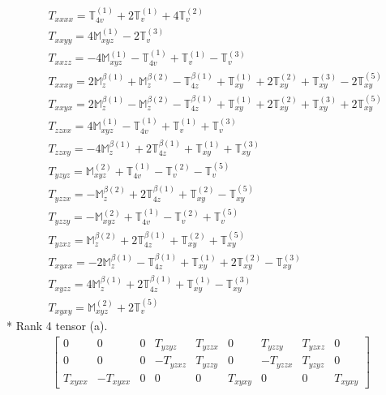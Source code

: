 \documentclass[fleqn,8pt,landscape]{jsarticle}
\begin{document}
\begin{align*}
& T_{xxxx} = \mathbb{T}_{4v}^{(1)} + 2 \mathbb{T}_{v}^{(1)} + 4 \mathbb{T}_{v}^{(2)} \\
& T_{xxyy} = 4 \mathbb{M}_{xyz}^{(1)} - 2 \mathbb{T}_{v}^{(3)} \\
& T_{xxzz} = - 4 \mathbb{M}_{xyz}^{(1)} - \mathbb{T}_{4v}^{(1)} + \mathbb{T}_{v}^{(1)} - \mathbb{T}_{v}^{(3)} \\
& T_{xxxy} = 2 \mathbb{M}_{z}^{\beta(1)} + \mathbb{M}_{z}^{\beta(2)} - \mathbb{T}_{4z}^{\beta(1)} + \mathbb{T}_{xy}^{(1)} + 2 \mathbb{T}_{xy}^{(2)} + \mathbb{T}_{xy}^{(3)} - 2 \mathbb{T}_{xy}^{(5)} \\
& T_{xxyx} = 2 \mathbb{M}_{z}^{\beta(1)} - \mathbb{M}_{z}^{\beta(2)} - \mathbb{T}_{4z}^{\beta(1)} + \mathbb{T}_{xy}^{(1)} + 2 \mathbb{T}_{xy}^{(2)} + \mathbb{T}_{xy}^{(3)} + 2 \mathbb{T}_{xy}^{(5)} \\
& T_{zzxx} = 4 \mathbb{M}_{xyz}^{(1)} - \mathbb{T}_{4v}^{(1)} + \mathbb{T}_{v}^{(1)} + \mathbb{T}_{v}^{(3)} \\
& T_{zzxy} = - 4 \mathbb{M}_{z}^{\beta(1)} + 2 \mathbb{T}_{4z}^{\beta(1)} + \mathbb{T}_{xy}^{(1)} + \mathbb{T}_{xy}^{(3)} \\
& T_{yzyz} = \mathbb{M}_{xyz}^{(2)} + \mathbb{T}_{4v}^{(1)} - \mathbb{T}_{v}^{(2)} - \mathbb{T}_{v}^{(5)} \\
& T_{yzzx} = - \mathbb{M}_{z}^{\beta(2)} + 2 \mathbb{T}_{4z}^{\beta(1)} + \mathbb{T}_{xy}^{(2)} - \mathbb{T}_{xy}^{(5)} \\
& T_{yzzy} = - \mathbb{M}_{xyz}^{(2)} + \mathbb{T}_{4v}^{(1)} - \mathbb{T}_{v}^{(2)} + \mathbb{T}_{v}^{(5)} \\
& T_{yzxz} = \mathbb{M}_{z}^{\beta(2)} + 2 \mathbb{T}_{4z}^{\beta(1)} + \mathbb{T}_{xy}^{(2)} + \mathbb{T}_{xy}^{(5)} \\
& T_{xyxx} = - 2 \mathbb{M}_{z}^{\beta(1)} - \mathbb{T}_{4z}^{\beta(1)} + \mathbb{T}_{xy}^{(1)} + 2 \mathbb{T}_{xy}^{(2)} - \mathbb{T}_{xy}^{(3)} \\
& T_{xyzz} = 4 \mathbb{M}_{z}^{\beta(1)} + 2 \mathbb{T}_{4z}^{\beta(1)} + \mathbb{T}_{xy}^{(1)} - \mathbb{T}_{xy}^{(3)} \\
& T_{xyxy} = \mathbb{M}_{xyz}^{(2)} + 2 \mathbb{T}_{v}^{(5)}
\end{align*}
* Rank 4 tensor (a).
\begin{align*}
\begin{bmatrix} 0 & 0 & 0 & T_{yzyz} & T_{yzzx} & 0 & T_{yzzy} & T_{yzxz} & 0 \\ 0 & 0 & 0 & - T_{yzxz} & T_{yzzy} & 0 & - T_{yzzx} & T_{yzyz} & 0 \\ T_{xyxx} & - T_{xyxx} & 0 & 0 & 0 & T_{xyxy} & 0 & 0 & T_{xyxy} \end{bmatrix}
\end{align*}
\end{document}
